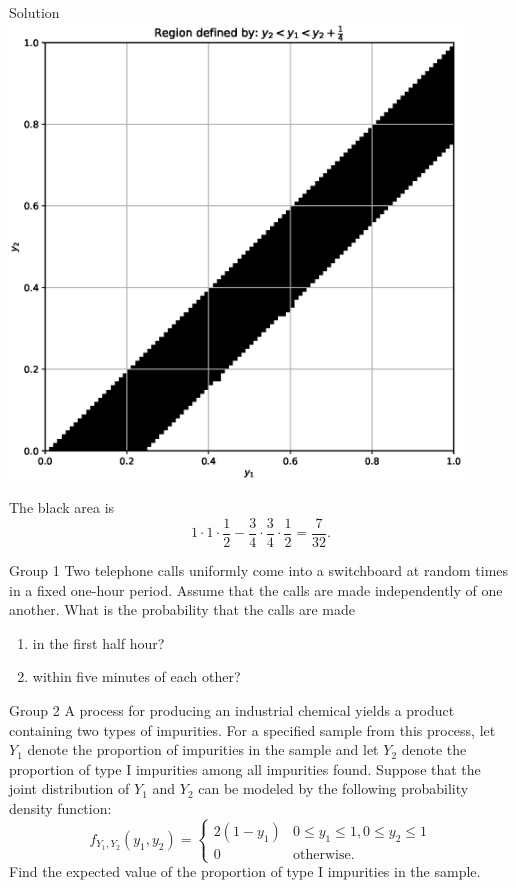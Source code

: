 \documentclass{article}
\begin{document}
\begin{solution}
    {Solution}
    \includegraphics[width=0.9\textwidth, center]{plot3.eps}

    The black area is
    \[
    1\cdot1\cdot\frac{1}{2}-\frac{3}{4}\cdot\frac{3}{4}\cdot\frac{1}{2}=\frac{7}{32}.
    \]
\end{solution}
\fi
\begin{problem}
    {Group 1}
    Two telephone calls uniformly come into a switchboard at random times in a fixed one-hour period. Assume that the calls are made independently of one another. What is the probability that the calls are made
    \begin{enumerate}
        \item in the first half hour?
        \item within five minutes of each other?
    \end{enumerate}
\end{problem}

\begin{problem}
    {Group 2}
    A process for producing an industrial chemical yields a product containing two types of impurities. For a specified sample from this process, let $Y_1$ denote the proportion of impurities in the sample and let $Y_2$ denote the proportion of type I impurities among all impurities found. Suppose that the joint distribution of $Y_1$ and $Y_2$ can be modeled by the following probability density function:
    \[
    f_{Y_1,Y_2}(y_1,y_2)={
        \begin{cases}
            2(1-y_1) & 0\leq y_1\leq1, 0\leq y_2\leq 1\\
            0 & \text{otherwise.}
        \end{cases}
    }
    \]
    Find the expected value of the proportion of type I impurities in the sample.
\end{problem}
\end{document}
